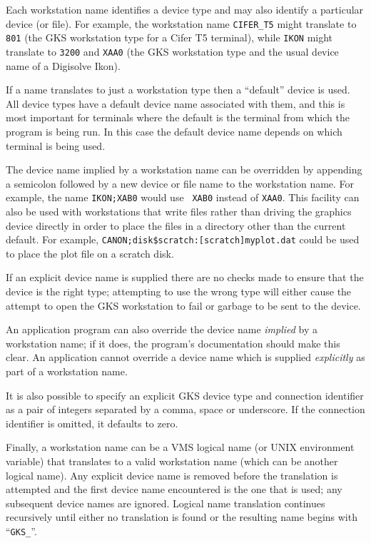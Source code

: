 Each workstation name identifies a device type and may also identify a
particular device (or file). For example, the workstation name {\tt CIFER\_T5}
might translate to {\tt 801} (the GKS workstation type for a Cifer T5
terminal), while {\tt IKON} might translate to {\tt 3200} and {\tt XAA0}
(the GKS workstation type and the usual device name of a Digisolve Ikon). 

If a name translates to just a workstation type then a  ``default'' device
is used. All device types have a default device name associated with them,
and this is most important for terminals where the default is the terminal
from which the program is being run. In this case the default device name
depends on which terminal is being used.

The device name implied by a workstation name can be overridden by
appending a semicolon followed by a new device or file name to the
workstation name. For example, the name {\tt IKON;XAB0} would use {\tt
XAB0} instead of {\tt XAA0}. This facility can also be used with
workstations that write files rather than driving the graphics device
directly in order to place the files in a directory other than the current
default. For example, {\tt CANON;disk\$scratch:[scratch]myplot.dat} could
be used to place the plot file on a scratch disk.

If an explicit device name is supplied there are no checks made to ensure
that the device is the right type; attempting to use the wrong type will
either cause the attempt to open the GKS workstation to fail or garbage to
be sent to the device.

An application program can also override the device name {\em implied\/} by a
workstation name; if it does, the program's documentation should make this
clear. An application cannot override a device name which is supplied
{\em explicitly\/} as part of a workstation name.

It is also possible to specify an explicit GKS device type and connection
identifier as a pair of integers separated by a comma, space or underscore. If
the connection identifier is omitted, it defaults to zero.

Finally, a workstation name can be a VMS logical name (or UNIX environment
variable) that translates to a valid workstation name (which can be another
logical name). Any explicit device
name is removed before the translation is attempted and the first device name
encountered is the one that is used; any subsequent device names are ignored.
Logical name translation continues recursively until either no translation is
found or the resulting name begins with ``{\tt GKS\_}''.

